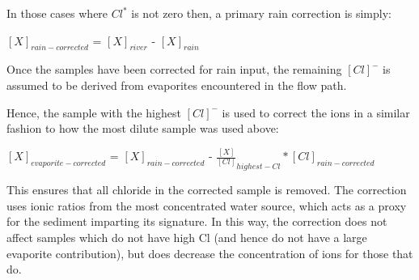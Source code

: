 
\bsk
\bsk





\bsk
\bsk


In those cases where $Cl^*$ is not zero then, a primary rain correction is simply:


\begin{center}
{\Large
$[X]_{rain-corrected}$  = $[X]_{river}$ - $[X]_{rain}$}

\end{center}

\bsk

Once the samples have been corrected for rain input, the remaining $[Cl]^{-}$ is assumed to be derived from evaporites encountered in the flow path. 

Hence, the sample with the highest $[Cl]^{-}$ is used to correct the ions in a similar fashion to how the most dilute sample was used above:

\begin{center}
{\Large
$[X]_{evaporite-corrected}$  = $[X]_{rain-corrected}$ - $\frac{[X]}{[Cl]}_{highest-Cl} * [Cl]_{rain-corrected}$}
\end{center}

This ensures that all chloride in the corrected sample is removed. 
The correction uses ionic ratios from the most concentrated water source, 
which acts as a proxy for the sediment imparting its signature. 
In this way, the correction does not affect samples which do not have high Cl 
(and hence do not have a large evaporite contribution), but does decrease the concentration of ions for those that do.

